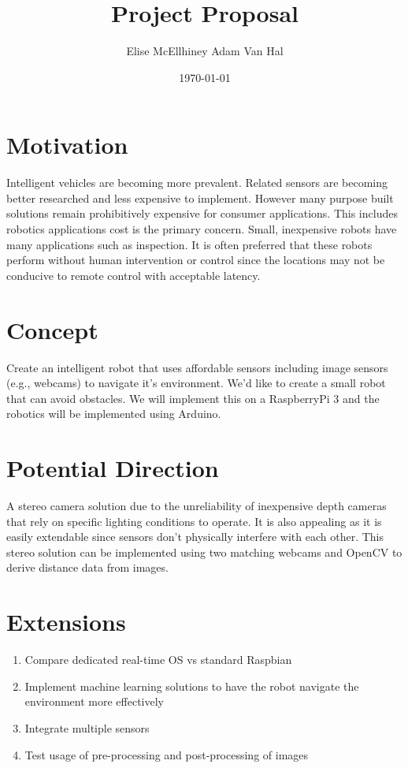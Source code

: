 \documentclass[11pt]{amsart}
\title{Project Proposal}
\author{Elise McEllhiney \qquad  Adam Van Hal}
\date{\today}                                           %
\begin{document}
\maketitle
\section{Motivation}
Intelligent vehicles are becoming more prevalent.  Related sensors are becoming better researched and less expensive to implement.  However many purpose built solutions remain prohibitively expensive for consumer applications.  This includes robotics applications cost is the primary concern.  Small, inexpensive robots have many applications such as inspection.  It is often preferred that these robots perform without human intervention or control since the locations may not be conducive to remote control with acceptable latency.

\section{Concept}
Create an intelligent robot that uses affordable sensors including image sensors (e.g., webcams) to navigate it's environment.  We'd like to create a small robot that can avoid obstacles.  We will implement this on a RaspberryPi 3 and the robotics will be implemented using Arduino.

\section{Potential Direction}
A stereo camera solution due to the unreliability of inexpensive depth cameras that rely on specific lighting conditions to operate.  It is also appealing as it is easily extendable since sensors don't physically interfere with each other.  This stereo solution can be implemented using two matching webcams and OpenCV to derive distance data from images.

\section{Extensions}
\begin{enumerate}
\item Compare dedicated real-time OS vs standard Raspbian\\
\item Implement machine learning solutions to have the robot navigate the environment more effectively\\
\item Integrate multiple sensors\\
\item Test usage of pre-processing and post-processing of images\\
\end{enumerate}

\end{document}
